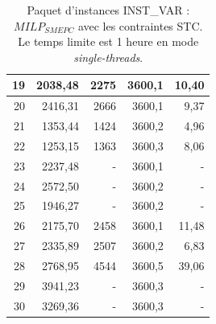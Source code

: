{\begin{table}[H]
\begin{tabular}{|r|r|r|r|r|}
		19	&	2038,48	&	2275	&	3600,1	&	10,40	\\ \hline
		20	&	2416,31	&	2666	&	3600,1	&	9,37	\\ \hline
		21	&	1353,44	&	1424	&	3600,2	&	4,96	\\ \hline
		22	&	1253,15	&	1363	&	3600,3	&	8,06	\\ \hline
		23	&	2237,48	&	-	&	3600,1	&	-	\\ \hline
		24	&	2572,50	&	-	&	3600,2	&	-	\\ \hline
		25	&	1946,27	&	-	&	3600,2	&	-	\\ \hline
		26	&	2175,70	&	2458	&	3600,1	&	11,48	\\ \hline
		27	&	2335,89	&	2507	&	3600,2	&	6,83	\\ \hline
		28	&	2768,95	&	4544	&	3600,5	&	39,06	\\ \hline
		29	&	3941,23	&	-	&	3600,3	&	-	\\ \hline
		30	&	3269,36	&	-	&	3600,3	&	-	\\ \hline
	
		\bottomrule
	\end{tabular}%
	\caption[Résultats de $MILP_{SMEPC}$ enrichi de STC sur INST\_VAR. Le temps limite est 1 heure en mode \textit{single-threads}]{Paquet d'instances INST\_VAR : $MILP_{SMEPC}$ avec les contraintes STC. Le temps limite est 1 heure en mode \textit{single-threads}.}
	\label{tab:ChSymStc}%
\end{table}%



}
